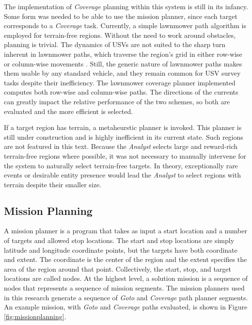 \documentclass{tamuccthesis}
\begin{document}
The implementation of \textit{Coverage} planning within this system is still in its infancy. Some form was needed to be able to use the mission planner, since each target corresponds to a \textit{Coverage} task. Currently, a simple lawnmower path algorithm is employed for terrain-free regions. Without the need to work around obstacles, planning is trivial. The dynamics of USVs are not suited to the sharp turn inherent in lawnmower paths, which traverse the region's grid in either row-wise or column-wise movements \cite{liu:2016}. Still, the generic nature of lawnmower paths makes them usable by any standard vehicle, and they remain common for USV survey tasks despite their inefficiency. The lawnmower coverage planner implemented computes both row-wise and column-wise paths. The directions of the currents can greatly impact the relative performance of the two schemes, so both are evaluated and the more efficient is selected. 

If a target region has terrain, a metaheurstic planner is invoked. This planner is still under construction and is highly inefficient in its current state. Such regions are not featured in this text. Because the \textit{Analyst} selects large and reward-rich terrain-free regions where possible, it was not necessary to manually intervene for the system to naturally select terrain-free targets. In theory, exceptionally rare events or desirable entity presence would lead the \textit{Analyst} to select regions with terrain despite their smaller size.


\subsection{Mission Planning}

A mission planner is a program that takes as input a start location and a number of targets and allowed stop locations. The start and stop locations are simply latitude and longitude coordinate points, but the targets have both coordinate and extent. The coordinate is the center of the region and the extent specifies the area of the region around that point. Collectively, the start, stop, and target locations are called nodes. At the highest level, a solution mission is a sequence of nodes that represents a sequence of mission segments. The mission planners used in this research generate a sequence of \textit{Goto} and \textit{Coverage} path planner segments. An example mission, with \textit{Goto} and \textit{Coverage} paths evaluated, is shown in Figure \ref{fig:missionplanning}. 
\end{document}
